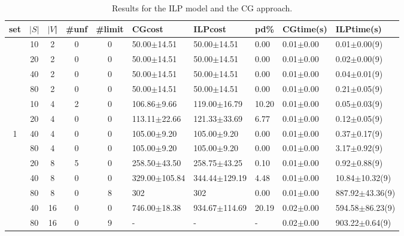 \documentclass[article]{llncs}
\begin{document}
\begin{table}[h]
\begin{center}
  \caption{Results for the ILP model and the CG approach. \label{tab:com1}}
  \begin{tabular}{c c c| c c l l l l l}
set &$|S|$ & $|V$| &  \#unf & \#limit & CGcost           &   ILPcost   &  pd\%   &  CGtime(s)        &  ILPtime(s)    \\
\hline
&10 & 2    & 0 & 0 &  50.00$\pm$14.51       &  50.00$\pm$14.51    &   0.00     &  0.01$\pm$0.00   &  0.01$\pm$0.00(9)        \\
&20 & 2    & 0 & 0 &  50.00$\pm$14.51       &  50.00$\pm$14.51    &   0.00     &  0.01$\pm$0.00   &  0.02$\pm$0.00(9)        \\
&40 & 2    & 0 & 0 &  50.00$\pm$14.51       &  50.00$\pm$14.51    &   0.00     &  0.01$\pm$0.00   &  0.04$\pm$0.01(9)        \\
&80 & 2    & 0 & 0 &  50.00$\pm$14.51       &  50.00$\pm$14.51    &   0.00     &  0.01$\pm$0.00   &  0.21$\pm$0.05(9)        \\
&10 & 4    & 2 & 0 &  106.86$\pm$9.66       &  119.00$\pm$16.79   &   10.20    &  0.01$\pm$0.00   &  0.05$\pm$0.03(9)        \\
&20 & 4    & 0 & 0 &  113.11$\pm$22.66      &  121.33$\pm$33.69   &   6.77     &  0.01$\pm$0.00   &  0.12$\pm$0.05(9)        \\
1&40 & 4   & 0 & 0 &  105.00$\pm$9.20       &  105.00$\pm$9.20     &  0.00     &  0.01$\pm$0.00   &  0.37$\pm$0.17(9)        \\
&80 & 4    & 0 & 0 &  105.00$\pm$9.20       &  105.00$\pm$9.20    &   0.00     &  0.01$\pm$0.00   &  3.17$\pm$0.92(9)        \\
&20 & 8    & 5 & 0 &  258.50$\pm$43.50      &  258.75$\pm$43.25   &   0.10     &  0.01$\pm$0.00   &  0.92$\pm$0.88(9)        \\
&40 & 8    & 0 & 0 &  329.00$\pm$105.84     &  344.44$\pm$129.19  &   4.48     &  0.01$\pm$0.00   &  10.84$\pm$10.32(9)      \\
&80 & 8    & 0 & 8 &  302                   &  302                &   0.00     &  0.01$\pm$0.00   &  887.92$\pm$43.36(9)     \\
&40 & 16   & 0 & 0 &  746.00$\pm$18.38      &  934.67$\pm$114.69  &   20.19    &  0.02$\pm$0.00   &  594.58$\pm$86.23(9)    \\
&80 & 16   & 0 & 9 &  -                     &  -                  &   -        &  0.02$\pm$0.00   &  903.22$\pm$0.64(9)      \\

\end{tabular}
\end{center}
\end{table}
\end{document}
